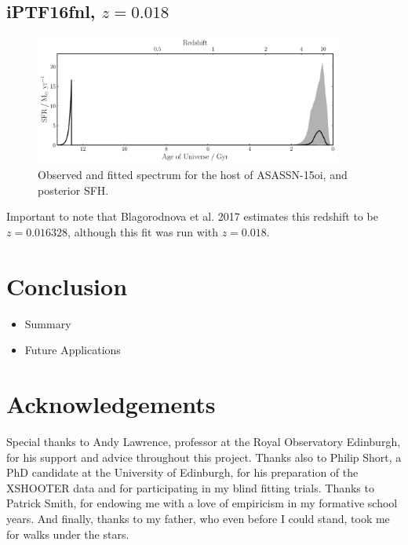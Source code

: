 \documentclass[a4paper,11pt]{article}
\begin{document}
\newpage
\subsection{iPTF16fnl, $z=0.018$}\label{sec:iPTF16fnl}
\begin{figure}[h!]
\centering
  \includegraphics[width=0.9\textwidth]{../pipes/plots/r4_dblplaw_burst/iPTF16fnl_sfh.pdf}
  \caption{Observed and fitted spectrum for the host of ASASSN-15oi, and posterior SFH.}
  \label{}
\end{figure}

Important to note that Blagorodnova et al. 2017 estimates this redshift to be $z=0.016328$, although this fit was run with $z=0.018$.\cite{Blagorodnova_2017}

\section{Conclusion}\label{sec:conclusion}
\begin{itemize}
  \item Summary
  \item Future Applications
\end{itemize}
\section{Acknowledgements}\label{sec:acknowledgements}

Special thanks to Andy Lawrence, professor at the Royal Observatory Edinburgh, for his support and advice throughout this project. Thanks also to Philip Short, a PhD candidate at the University of Edinburgh, for his preparation of the XSHOOTER data and for participating in my blind fitting trials. Thanks to Patrick Smith, for endowing me with a love of empiricism in my formative school years. And finally, thanks to my father, who even before I could stand, took me for walks under the stars.

\printbibliography
\end{document}
